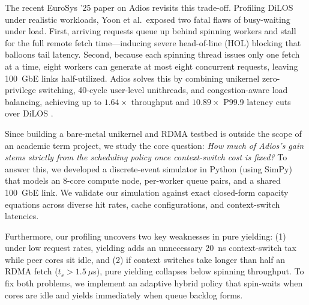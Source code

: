 The recent EuroSys '25 paper on Adios \cite{adios} revisits this trade-off. Profiling DiLOS under realistic workloads, Yoon et al.\ exposed two fatal flaws of busy-waiting under load. First, arriving requests queue up behind spinning workers and stall for the full remote fetch time---inducing severe head-of-line (HOL) blocking that balloons tail latency. Second, because each spinning thread issues only one fetch at a time, eight workers can generate at most eight concurrent requests, leaving 100~GbE links half-utilized. Adios solves this by combining unikernel zero-privilege switching, 40-cycle user-level unithreads, and congestion-aware load balancing, achieving up to $1.64\times$ throughput and $10.89\times$ P99.9 latency cuts over DiLOS \cite{adios}.

Since building a bare-metal unikernel and RDMA testbed is outside the scope of an academic term project, we study the core question: \emph{How much of Adios's gain stems strictly from the scheduling policy once context-switch cost is fixed?} To answer this, we developed a discrete-event simulator in Python (using SimPy) that models an 8-core compute node, per-worker queue pairs, and a shared 100~GbE link. We validate our simulation against exact closed-form capacity equations across diverse hit rates, cache configurations, and context-switch latencies.

Furthermore, our profiling uncovers two key weaknesses in pure yielding: (1) under low request rates, yielding adds an unnecessary 20~ns context-switch tax while peer cores sit idle, and (2) if context switches take longer than half an RDMA fetch ($t_s > 1.5~\mu$s), pure yielding collapses below spinning throughput. To fix both problems, we implement an adaptive hybrid policy that spin-waits when cores are idle and yields immediately when queue backlog forms.

